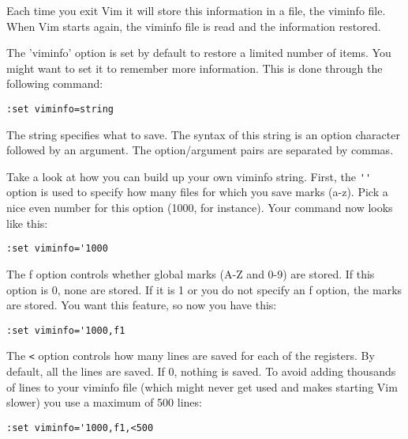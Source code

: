 Each time you exit Vim it will store this information in a file, the viminfo file.
When Vim starts again, the viminfo file is read and the information restored.

The 'viminfo' option is set by default to restore a limited number of items.
You might want to set it to remember more information.
This is done through the following command:

\begin{Verbatim}[samepage=true]
 :set viminfo=string
\end{Verbatim}

The string specifies what to save.
The syntax of this string is an option character followed by an argument.
The option/argument pairs are separated by commas.

Take a look at how you can build up your own viminfo string.
First, the \verb!''! option is used to specify how many files for which you save marks (a-z).
Pick a nice even number for this option (1000, for instance).
Your command now looks like this:

\begin{Verbatim}[samepage=true]
 :set viminfo='1000
\end{Verbatim}

The f option controls whether global marks (A-Z and 0-9) are stored.
If this option is 0, none are stored.
If it is 1 or you do not specify an f option, the marks are stored.
You want this feature, so now you have this:

\begin{Verbatim}[samepage=true]
 :set viminfo='1000,f1
\end{Verbatim}

The \verb!<! option controls how many lines are saved for each of the registers.
By default, all the lines are saved.
If 0, nothing is saved.
To avoid adding thousands of lines to your viminfo file (which might never get used and makes starting Vim slower) you use a maximum of 500 lines:

\begin{Verbatim}[samepage=true]
 :set viminfo='1000,f1,<500
\end{Verbatim}
 
